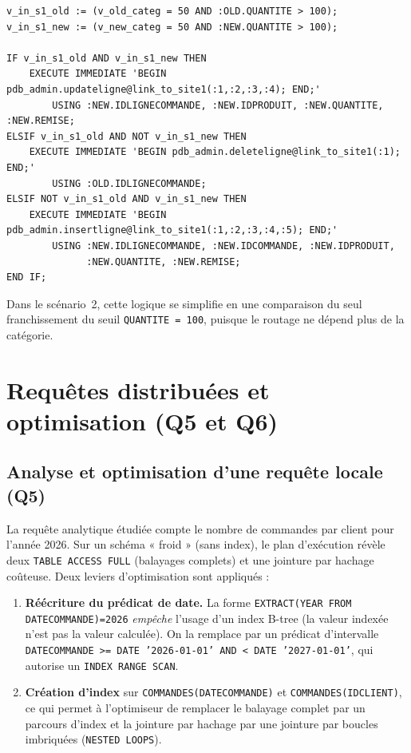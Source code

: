 \documentclass[11pt,a4paper]{article}
\begin{document}
\begin{lstlisting}[style=sql,caption={Logique de transition de fragment à la mise à jour (extrait, partie Site~1).},label={lst:trig-update}]
v_in_s1_old := (v_old_categ = 50 AND :OLD.QUANTITE > 100);
v_in_s1_new := (v_new_categ = 50 AND :NEW.QUANTITE > 100);

IF v_in_s1_old AND v_in_s1_new THEN
    EXECUTE IMMEDIATE 'BEGIN pdb_admin.updateligne@link_to_site1(:1,:2,:3,:4); END;'
        USING :NEW.IDLIGNECOMMANDE, :NEW.IDPRODUIT, :NEW.QUANTITE, :NEW.REMISE;
ELSIF v_in_s1_old AND NOT v_in_s1_new THEN
    EXECUTE IMMEDIATE 'BEGIN pdb_admin.deleteligne@link_to_site1(:1); END;'
        USING :OLD.IDLIGNECOMMANDE;
ELSIF NOT v_in_s1_old AND v_in_s1_new THEN
    EXECUTE IMMEDIATE 'BEGIN pdb_admin.insertligne@link_to_site1(:1,:2,:3,:4,:5); END;'
        USING :NEW.IDLIGNECOMMANDE, :NEW.IDCOMMANDE, :NEW.IDPRODUIT,
              :NEW.QUANTITE, :NEW.REMISE;
END IF;
\end{lstlisting}

Dans le scénario~2, cette logique se simplifie en une comparaison du seul
franchissement du seuil \texttt{QUANTITE = 100}, puisque le routage ne dépend
plus de la catégorie.

\section{Requêtes distribuées et optimisation (Q5 et Q6)}

\subsection{Analyse et optimisation d'une requête locale (Q5)}

La requête analytique étudiée compte le nombre de commandes par client pour
l'année 2026. Sur un schéma « froid » (sans index), le plan d'exécution révèle
deux \texttt{TABLE ACCESS FULL} (balayages complets) et une jointure par hachage
coûteuse. Deux leviers d'optimisation sont appliqués :

\begin{enumerate}[leftmargin=1.4cm]
  \item \textbf{Réécriture du prédicat de date.} La forme
    \texttt{EXTRACT(YEAR FROM DATECOMMANDE)=2026} \emph{empêche} l'usage d'un
    index B-tree (la valeur indexée n'est pas la valeur calculée). On la
    remplace par un prédicat d'intervalle
    \texttt{DATECOMMANDE >= DATE '2026-01-01' AND < DATE '2027-01-01'}, qui
    autorise un \texttt{INDEX RANGE SCAN}.
  \item \textbf{Création d'index} sur \texttt{COMMANDES(DATECOMMANDE)} et
    \texttt{COMMANDES(IDCLIENT)}, ce qui permet à l'optimiseur de remplacer le
    balayage complet par un parcours d'index et la jointure par hachage par une
    jointure par boucles imbriquées (\texttt{NESTED LOOPS}).
\end{enumerate}
\end{document}
